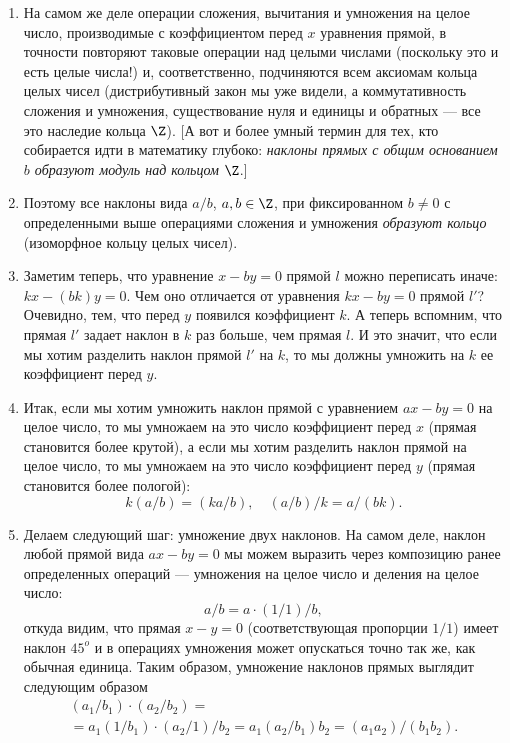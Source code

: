 \begin{enumerate}
\item На самом же деле операции сложения, вычитания и умножения на целое число, производимые с коэффициентом перед $x$ уравнения прямой, в точности повторяют таковые операции над целыми числами (поскольку это и есть целые числа!) и, соответственно, подчиняются всем аксиомам кольца целых чисел (дистрибутивный закон мы уже видели, а коммутативность сложения и умножения, существование нуля и единицы и обратных --- все это наследие кольца $\Z$). [А вот и более умный термин для тех, кто собирается идти в математику глубоко: \textit{наклоны прямых с общим основанием $b$ образуют модуль над кольцом} $\Z$.]
\item Поэтому все наклоны вида $a/b$, $a,b\in\Z$, при фиксированном $b\ne 0$ с определенными выше операциями сложения и умножения \textit{образуют кольцо} (изоморфное кольцу целых чисел). 
\item Заметим теперь, что уравнение $x-by=0$ прямой $l$ можно переписать иначе: $kx-(bk)y=0$. Чем оно отличается от уравнения $kx-by=0$ прямой $l'$? Очевидно, тем, что перед $y$ появился коэффициент $k$. А теперь вспомним, что прямая $l'$ задает наклон в $k$ раз больше, чем прямая $l$. И это значит, что если мы хотим разделить наклон прямой $l'$ на $k$, то мы должны умножить на $k$ ее коэффициент перед $y$.

\item Итак, если мы хотим умножить наклон прямой с уравнением $ax-by=0$ на целое число, то мы умножаем на это число коэффициент перед $x$ (прямая становится более крутой), а если мы хотим разделить наклон прямой на целое число, то мы умножаем на это число коэффициент перед $y$ (прямая становится более пологой):
$$
k(a/b)=(ka/b),\quad (a/b)/k = a/(bk).
$$






\item Делаем следующий шаг: умножение двух наклонов. На самом деле, наклон любой прямой вида $ax-by=0$ мы можем выразить через композицию ранее определенных операций --- умножения на целое число и деления на целое число:
$$
a/b = a\cdot(1/1)/b,
$$
откуда видим, что прямая $x-y=0$ (соответствующая пропорции $1/1$) имеет наклон $45^o$ и в операциях умножения может опускаться точно так же, как обычная единица. Таким образом, умножение наклонов прямых выглядит следующим образом
\begin{gather*}
(a_1/b_1)\cdot(a_2/b_2) = \\
= a_1(1/b_1)\cdot (a_2/1)/b_2 = a_1(a_2/b_1)b_2 = (a_1a_2)/(b_1b_2).
\end{gather*}


\end{enumerate}
